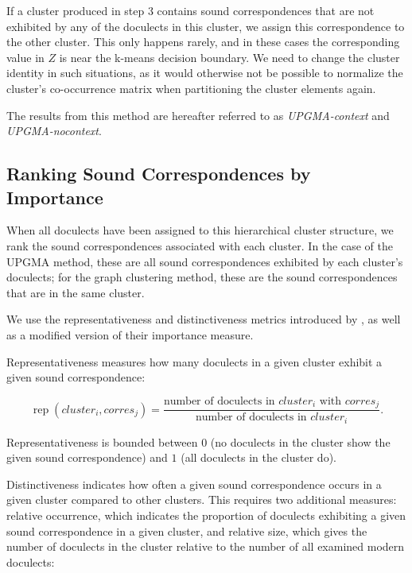 \documentclass[a4paper]{article}
\begin{document}
If a cluster produced in step 3 contains
sound correspondences that are not exhibited
by any of the doculects in this cluster,
we assign this correspondence to the other cluster.
This only happens rarely, and in these cases the corresponding
value in $Z$ is near the k-means decision boundary.
We need to change the cluster identity in such situations,
as it would otherwise not be possible to normalize
the cluster's co-occurrence matrix when partitioning
the cluster elements again.

The results from this method are hereafter referred to
as \textit{UPGMA-context} and \textit{UPGMA-nocontext}.

\subsection{Ranking Sound Correspondences by Importance}
\label{subsec:ranking}

When all doculects have been assigned to this hierarchical cluster structure,
we rank the sound correspondences associated with each cluster.
In the case of the UPGMA method, these are
all sound correspondences exhibited by each cluster's doculects;
for the graph clustering method,
these are the sound correspondences that are in the same cluster.

We use the representativeness and distinctiveness metrics
introduced by \citet{wieling2011bipartite},
as well as a modified version of their importance measure.

Representativeness measures how many doculects in a given cluster
exhibit a given sound correspondence:

\begin{equation*}
\operatorname{rep}(cluster_i, corres_j) = 
\frac{\text{number of doculects in } cluster_i \text{ with }  corres_j}
{\text{number of doculects in }  cluster_i}
.
\end{equation*}

Representativeness is bounded between
$0$ (no doculects in the cluster show the given sound correspondence)
and $1$ (all doculects in the cluster do).

Distinctiveness indicates how often a given sound correspondence
occurs in a given cluster compared to other clusters. 
This requires two additional measures:
relative occurrence, which indicates
the proportion of doculects exhibiting
a given sound correspondence in a given cluster,
and relative size, which gives the number of doculects 
in the cluster relative to the number of all examined modern doculects:
\end{document}
